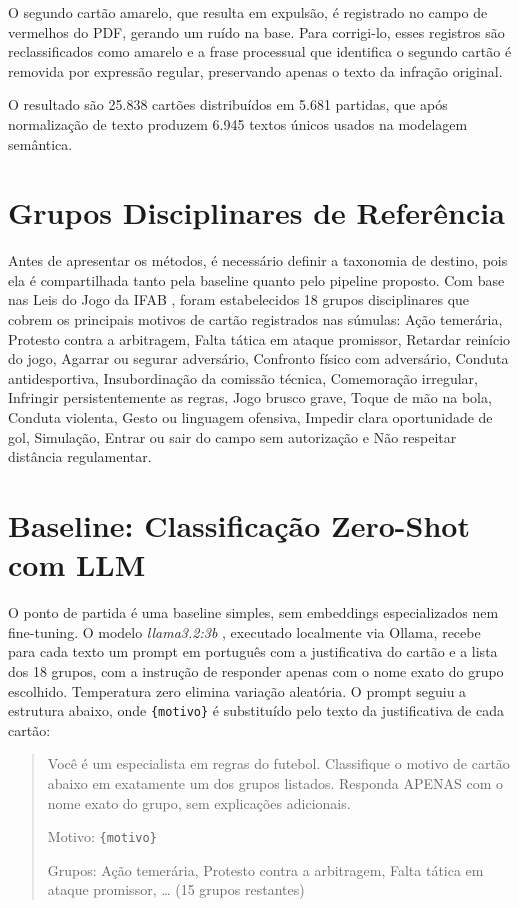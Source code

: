 \documentclass[
12pt,
openany,
oneside,
a4paper,
chapter=TITLE,
english,
french,
spanish,
brazil
]{USPSC-classe/USPSC}
\begin{document}
O segundo cartão amarelo, que resulta em expulsão, é registrado no campo de vermelhos do PDF, gerando um ruído na base. Para corrigi-lo, esses registros são reclassificados como amarelo e a frase processual que identifica o segundo cartão é removida por expressão regular, preservando apenas o texto da infração original.

O resultado são 25.838 cartões distribuídos em 5.681 partidas, que após normalização de texto produzem 6.945 textos únicos usados na modelagem semântica.

\section{Grupos Disciplinares de Referência}

Antes de apresentar os métodos, é necessário definir a taxonomia de destino, pois ela é compartilhada tanto pela baseline quanto pelo pipeline proposto. Com base nas Leis do Jogo da IFAB \cite{ifab2024laws}, foram estabelecidos 18 grupos disciplinares que cobrem os principais motivos de cartão registrados nas súmulas: Ação temerária, Protesto contra a arbitragem, Falta tática em ataque promissor, Retardar reinício do jogo, Agarrar ou segurar adversário, Confronto físico com adversário, Conduta antidesportiva, Insubordinação da comissão técnica, Comemoração irregular, Infringir persistentemente as regras, Jogo brusco grave, Toque de mão na bola, Conduta violenta, Gesto ou linguagem ofensiva, Impedir clara oportunidade de gol, Simulação, Entrar ou sair do campo sem autorização e Não respeitar distância regulamentar.

\section{Baseline: Classificação Zero-Shot com LLM}

O ponto de partida é uma baseline simples, sem embeddings especializados nem fine-tuning. O modelo \textit{llama3.2:3b} \cite{meta2024llama3}, executado localmente via Ollama, recebe para cada texto um prompt em português com a justificativa do cartão e a lista dos 18 grupos, com a instrução de responder apenas com o nome exato do grupo escolhido. Temperatura zero elimina variação aleatória. O prompt seguiu a estrutura abaixo, onde \texttt{\{motivo\}} é substituído pelo texto da justificativa de cada cartão:

\begin{quote}
\small
Você é um especialista em regras do futebol. Classifique o motivo de cartão abaixo em exatamente um dos grupos listados. Responda APENAS com o nome exato do grupo, sem explicações adicionais.

Motivo: \texttt{\{motivo\}}

Grupos: Ação temerária, Protesto contra a arbitragem, Falta tática em ataque promissor, \ldots{} (15 grupos restantes)
\end{quote}
\end{document}
